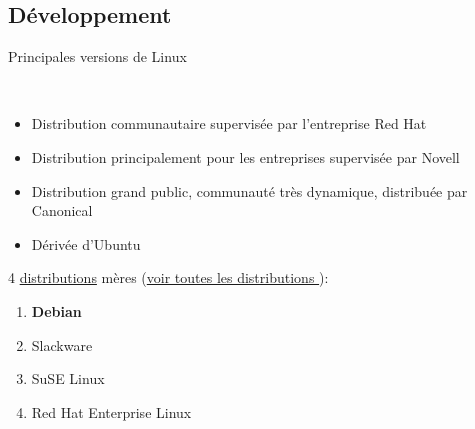 \documentclass{beamer}
\begin{document}
\subsection*{D\'eveloppement}
\begin{frame}
  \begin{block}{ Principales versions de Linux}

    ~~~~~~~~~~~~~~~~%
    \begin{minipage}[t]{0.85\linewidth}
      \begin{itemize}
      \item[Fedora :] Distribution communautaire supervisée par l'entreprise Red Hat
      \item[openSUSE :] Distribution principalement pour les entreprises supervis\'ee par Novell
      \item[Ubuntu :] Distribution grand public, communaut\'e tr\`es dynamique, distribuée par Canonical
      \item[Linux Mint :] Dérivée d'Ubuntu
      \end{itemize}
    \end{minipage}

  \end{block}

\vspace{3mm}
4 \href{https://fr.wikipedia.org/wiki/Distribution_Linux}{distributions} mères (\href{https://fr.wikipedia.org/wiki/Distribution_Linux\#/media/File:Linux_Distribution_Timeline.svg}{voir toutes les distributions \faExternalLink}):\\
\begin{enumerate}
\item \textbf{Debian}
\item Slackware
\item SuSE Linux
\item Red Hat Enterprise Linux
\end{enumerate}
\end{frame}
\end{document}
